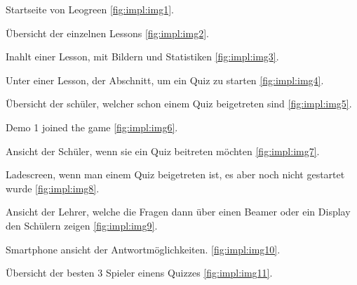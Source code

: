 Startseite von Leogreen \ref{fig:impl:img1}.

Übersicht der einzelnen Lessons \ref{fig:impl:img2}.

Inahlt einer Lesson, mit Bildern und Statistiken \ref{fig:impl:img3}.

Unter einer Lesson, der Abschnitt, um ein Quiz zu starten \ref{fig:impl:img4}.

Übersicht der schüler, welcher schon einem Quiz beigetreten sind \ref{fig:impl:img5}.

Demo 1 joined the game \ref{fig:impl:img6}.

Ansicht der Schüler, wenn sie ein Quiz beitreten möchten \ref{fig:impl:img7}.

Ladescreen, wenn man einem Quiz beigetreten ist, es aber noch nicht gestartet wurde \ref{fig:impl:img8}.

Ansicht der Lehrer, welche die Fragen dann über einen Beamer oder ein Display den Schülern zeigen \ref{fig:impl:img9}.

Smartphone ansicht der Antwortmöglichkeiten. \ref{fig:impl:img10}.

Übersicht der besten 3 Spieler einens Quizzes \ref{fig:impl:img11}.



